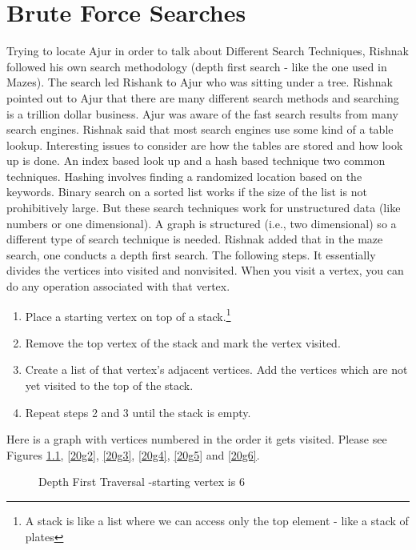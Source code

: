\chapter{Brute Force Searches}

Trying to locate Ajur in order to talk about Different Search Techniques, Rishnak followed his own search methodology (depth first search - like the one used in Mazes). The search led Rishank to Ajur who was sitting under a tree. Rishnak pointed out to Ajur that there are many different search methods and searching is a trillion dollar business. Ajur was aware of the fast search results from many search engines. Rishnak said that most search engines use some kind of a table lookup. Interesting issues to consider are how the tables are stored and how look up is done.  An index based look up and a hash based technique two common techniques. Hashing involves finding a randomized location based on the keywords.  Binary search on a sorted list works if the size of the list is not prohibitively large. But these search techniques work for unstructured data (like numbers or one dimensional). A graph is structured (i.e., two dimensional) so a different type of search technique is needed.
Rishnak added that in the maze search, one conducts a depth first search. The following steps. It essentially divides the vertices into visited and nonvisited. When you visit a vertex, you can do any
operation associated with that vertex.

\begin{enumerate}
    \item Place a starting vertex on top of a stack.\footnote{A stack is like a list where we can access only the top element - like a stack of plates}
     \item Remove the top vertex of the stack and mark the vertex visited.
     \item Create a list of that vertex's adjacent vertices. Add the vertices which are not yet visited  to the top of the stack.
     \item Repeat steps 2 and 3 until the stack is empty.
\end{enumerate}

Here is a graph with vertices numbered in the order it gets visited. Please see Figures \ref{20g1}, \ref{20g2}, \ref{20g3}, \ref{20g4}, \ref{20g5} and \ref{20g6}. 
\begin{figure}
\begin{center}
\caption{ Depth First Traversal -starting vertex is 6}\label{20g1}
\end{center}
\end{figure}

